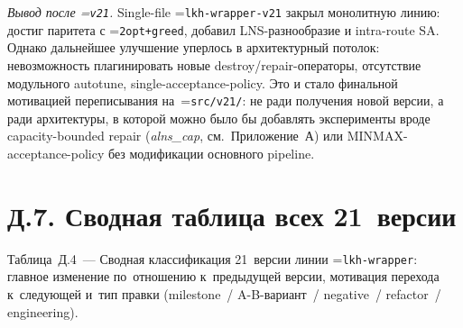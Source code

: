 \documentclass[a4paper,14pt]{extreport}
\makeatletter
\let\old@texttt\texttt
\renewcommand{\texttt}[1]{{\sloppy\hyphenchar\font=\m@ne\old@texttt{#1}}}
\makeatother
\begin{document}
\textit{Вывод после \texttt{v21}.} Single-file \texttt{lkh-wrapper-v21} закрыл монолитную линию: достиг паритета с \texttt{2opt+greed}, добавил LNS-разнообразие и intra-route SA. Однако дальнейшее улучшение уперлось в архитектурный потолок: невозможность плагинировать новые destroy/repair-операторы, отсутствие модульного autotune, single-acceptance-policy. Это и стало финальной мотивацией переписывания на~\texttt{src/v21/}: не ради получения новой версии, а ради архитектуры, в которой можно было бы добавлять эксперименты вроде capacity-bounded repair (\emph{alns\_cap}, см.~Приложение~А) или MINMAX-acceptance-policy без модификации основного pipeline.

\section*{Д.7. Сводная таблица всех 21~версии}

\medskip
\noindent Таблица~Д.4~--- Сводная классификация 21~версии линии \texttt{lkh-wrapper}: главное изменение по~отношению к~предыдущей версии, мотивация перехода к~следующей и~тип правки (milestone~/ A-B-вариант~/ negative~/ refactor~/ engineering).
\end{document}

